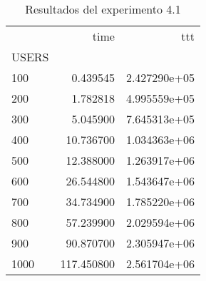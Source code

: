 \begin{table}
\centering
\caption{Resultados del experimento 4.1}
\label{tab:ex4u}
\begin{tabular}{lrr}
\toprule
{} &        time &           ttt \\
USERS &             &               \\
\midrule
100   &    0.439545 &  2.427290e+05 \\
200   &    1.782818 &  4.995559e+05 \\
300   &    5.045900 &  7.645313e+05 \\
400   &   10.736700 &  1.034363e+06 \\
500   &   12.388000 &  1.263917e+06 \\
600   &   26.544800 &  1.543647e+06 \\
700   &   34.734900 &  1.785220e+06 \\
800   &   57.239900 &  2.029594e+06 \\
900   &   90.870700 &  2.305947e+06 \\
1000  &  117.450800 &  2.561704e+06 \\
\bottomrule
\end{tabular}
\end{table}
